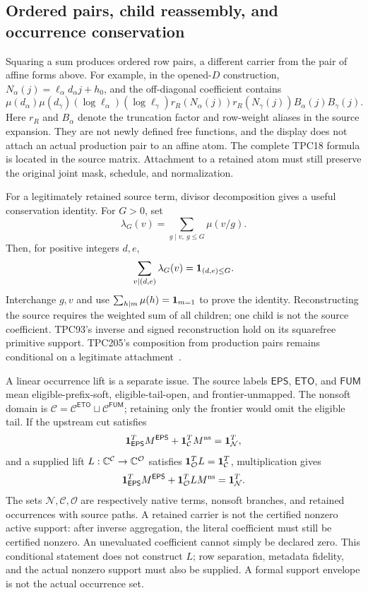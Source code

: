 \subsection{Ordered pairs, child reassembly, and occurrence conservation}
Squaring a sum produces ordered row pairs, a different carrier from the pair of affine forms above. For example, in the opened-$D$ construction, $N_\alpha(j)=\ell_\alpha d_\alpha j+h_0$, and the off-diagonal coefficient contains
\[
\mu(d_\alpha)\mu(d_\gamma)(\log\ell_\alpha)(\log\ell_\gamma)
r_R(N_\alpha(j))r_R(N_\gamma(j))B_\alpha(j)B_\gamma(j).
\]
Here $r_R$ and $B_\alpha$ denote the truncation factor and row-weight aliases in the source expansion. They are not newly defined free functions, and the display does not attach an actual production pair to an affine atom. The complete TPC18 formula is located in the source matrix. Attachment to a retained atom must still preserve the original joint mask, schedule, and normalization.

For a legitimately retained source term, divisor decomposition gives a useful conservation identity. For $G>0$, set
\[
\lambda_G(v)=\sum_{g\mid v,\ g\le G}\mu(v/g).
\]
Then, for positive integers $d,e$,
\[
\sum_{v\mid(d,e)}\lambda_G(v)=\mathbf 1_{(d,e)\le G}.
\]
Interchange $g,v$ and use $\sum_{h\mid m}\mu(h)=\mathbf 1_{m=1}$ to prove the identity. Reconstructing the source requires the weighted sum of all children; one child is not the source coefficient. TPC93's inverse and signed reconstruction hold on its squarefree primitive support. TPC205's composition from production pairs remains conditional on a legitimate attachment~\cite{archivestructure}.

A linear occurrence lift is a separate issue. The source labels $\mathsf{EPS}$, $\mathsf{ETO}$, and $\mathsf{FUM}$ mean eligible-prefix-soft, eligible-tail-open, and frontier-unmapped. The nonsoft domain is
$\mathcal C=\mathcal C^{\mathsf{ETO}}\sqcup\mathcal C^{\mathsf{FUM}}$; retaining only the frontier would omit the eligible tail. If the upstream cut satisfies
\[
\mathbf 1_{\mathsf{EPS}}^TM^{\mathsf{EPS}}+\mathbf 1_{\mathcal C}^TM^{\rm ns}=\mathbf 1_{\mathcal N}^T,
\]
and a supplied lift $L:\mathbb C^{\mathcal C}\to\mathbb C^{\mathcal O}$ satisfies $\mathbf 1_{\mathcal O}^TL=\mathbf 1_{\mathcal C}^T$, multiplication gives
\[
\mathbf 1_{\mathsf{EPS}}^TM^{\mathsf{EPS}}+\mathbf 1_{\mathcal O}^TLM^{\rm ns}=\mathbf 1_{\mathcal N}^T.
\]
The sets $\mathcal N,\mathcal C,\mathcal O$ are respectively native terms, nonsoft branches, and retained occurrences with source paths. A retained carrier is not the certified nonzero active support: after inverse aggregation, the literal coefficient must still be certified nonzero. An unevaluated coefficient cannot simply be declared zero. This conditional statement does not construct $L$; row separation, metadata fidelity, and the actual nonzero support must also be supplied. A formal support envelope is not the actual occurrence set.

